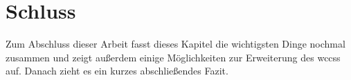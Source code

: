 \chapter{Schluss}
    \label{chapter:SummaryAndOutlook}
    Zum Abschluss dieser Arbeit fasst dieses Kapitel
    die wichtigsten Dinge nochmal zusammen
    und zeigt außerdem einige Möglichkeiten zur Erweiterung des \glspl{wccs} auf.
    Danach zieht es ein kurzes abschließendes Fazit.

    
    
    